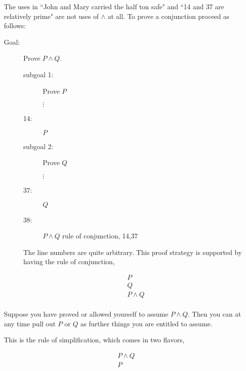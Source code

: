\documentclass[12pt]{article}
\begin{document}
The uses in ``John and Mary carried the half ton safe" and ``14 and 37 are relatively prime" are not uses of $\wedge$ at all.
\newpage
To prove a conjunction proceed as follows:

\begin{description}

\item[Goal: ] Prove $P \wedge Q$.

\begin{description}

\item[subgoal 1:]  Prove $P$

$\vdots$

\item[14:] $P$

\item[subgoal 2:] Prove $Q$

$\vdots$

\item[37:] $Q$

\item[38:]  $P \wedge Q$ rule of conjunction, 14,37

\end{description}

The line numbers are quite arbitrary.  This proof strategy is supported by having the rule of conjunction,

$$\begin{array}{c}

P \\

Q \\ \hline

P \wedge Q \\
\end{array}$$


\end{description}

Suppose you have proved or allowed yourself to assume $P \wedge Q$.  Then you can at any time pull out $P$ or $Q$ as further things you are entitled to assume.

This is the rule of simplification, which comes in two flavors,

$$\begin{array}{c}

P \wedge Q \\ \hline

P  \\
\end{array}$$
\end{document}
